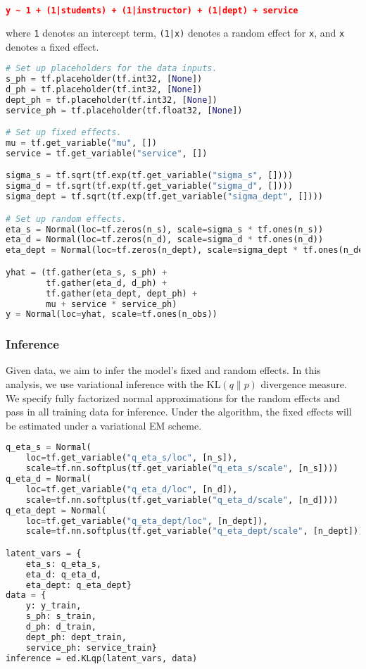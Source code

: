 \begin{lstlisting}[language=JSON]
y ~ 1 + (1|students) + (1|instructor) + (1|dept) + service
\end{lstlisting}
where \texttt{1} denotes an intercept term, \texttt{(1|x)} denotes a
random effect for  \texttt{x}, and \texttt{x} denotes a fixed effect.

\begin{lstlisting}[language=Python]
# Set up placeholders for the data inputs.
s_ph = tf.placeholder(tf.int32, [None])
d_ph = tf.placeholder(tf.int32, [None])
dept_ph = tf.placeholder(tf.int32, [None])
service_ph = tf.placeholder(tf.float32, [None])

# Set up fixed effects.
mu = tf.get_variable("mu", [])
service = tf.get_variable("service", [])

sigma_s = tf.sqrt(tf.exp(tf.get_variable("sigma_s", [])))
sigma_d = tf.sqrt(tf.exp(tf.get_variable("sigma_d", [])))
sigma_dept = tf.sqrt(tf.exp(tf.get_variable("sigma_dept", [])))

# Set up random effects.
eta_s = Normal(loc=tf.zeros(n_s), scale=sigma_s * tf.ones(n_s))
eta_d = Normal(loc=tf.zeros(n_d), scale=sigma_d * tf.ones(n_d))
eta_dept = Normal(loc=tf.zeros(n_dept), scale=sigma_dept * tf.ones(n_dept))

yhat = (tf.gather(eta_s, s_ph) +
        tf.gather(eta_d, d_ph) +
        tf.gather(eta_dept, dept_ph) +
        mu + service * service_ph)
y = Normal(loc=yhat, scale=tf.ones(n_obs))
\end{lstlisting}

\subsubsection{Inference}

Given data, we aim to infer the model's fixed and random effects.
In this analysis, we use variational inference with the
$\text{KL}(q\|p)$ divergence measure. We specify fully factorized
normal approximations for the random effects and pass in all training
data for inference. Under the algorithm, the fixed effects will be
estimated under a variational EM scheme.

\begin{lstlisting}[language=Python]
q_eta_s = Normal(
    loc=tf.get_variable("q_eta_s/loc", [n_s]),
    scale=tf.nn.softplus(tf.get_variable("q_eta_s/scale", [n_s])))
q_eta_d = Normal(
    loc=tf.get_variable("q_eta_d/loc", [n_d]),
    scale=tf.nn.softplus(tf.get_variable("q_eta_d/scale", [n_d])))
q_eta_dept = Normal(
    loc=tf.get_variable("q_eta_dept/loc", [n_dept]),
    scale=tf.nn.softplus(tf.get_variable("q_eta_dept/scale", [n_dept])))

latent_vars = {
    eta_s: q_eta_s,
    eta_d: q_eta_d,
    eta_dept: q_eta_dept}
data = {
    y: y_train,
    s_ph: s_train,
    d_ph: d_train,
    dept_ph: dept_train,
    service_ph: service_train}
inference = ed.KLqp(latent_vars, data)
\end{lstlisting}

